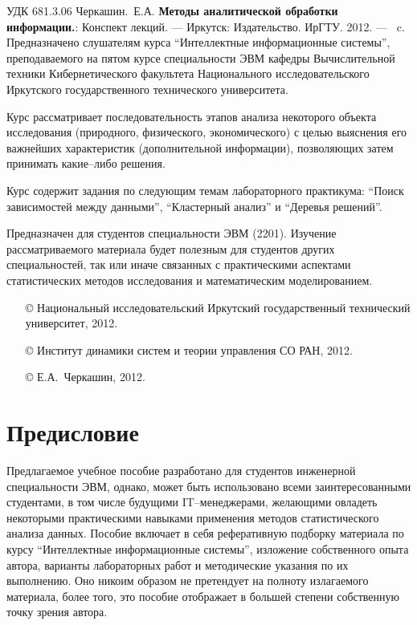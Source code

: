\documentclass[12pt, openany, twoside]{book} %
\newenvironment{mygroup}{}{}
\begin{document}
\newpage
\begin{mygroup}
\thispagestyle{empty}
\noindent УДК 681.3.06
\vfill\footnotesize
{Черкашин.~Е.А.} {\bf Методы аналитической обработки информации.}: Конспект лекций. ---
Иркутск: Издательство. ИрГТУ. 2012. --- \pageref{pg:lastpage}~c.
\vfill
Предназначено слушателям курса
``Интеллектные информационные системы'', преподаваемого на пятом курсе
специальности ЭВМ кафедры Вычислительной техники Кибернетического факультета
Национального исследовательского Иркутского государственного технического университета.

Курс рассматривает последовательность этапов анализа некоторого объекта исследования (природного, физического, экономического) с целью выяснения его важнейших  характеристик (дополнительной информации), позволяющих затем принимать какие--либо решения.

Курс содержит задания по следующим темам лабораторного практикума: ``Поиск зависимостей между данными'', ``Кластерный анализ'' и ``Деревья решений''.

Предназначен для студентов специальности ЭВМ (2201). Изучение рассматриваемого материала будет полезным для студентов других специальностей, так или иначе связанных с практическими аспектами статистических методов исследования и математическим моделированием.

\vfill\vfill

\vfill
\hbox{}\hfill
\begin{minipage}{0.6\linewidth}
\begin{itemize}
\setlength{\itemsep}{0pt}
\setlength{\parsep}{0pt}
\item[\copyright{}] Национальный исследовательский Иркутский государственный технический университет, 2012.\item[\copyright{}] Институт динамики систем и теории управления СО РАН, 2012.
\item[\copyright{}] Е.А.~Черкашин, 2012.
\end{itemize}
\end{minipage}
\end{mygroup}
\tableofcontents
\clearpage

\newpage
\section*{Предисловие}
\thispagestyle{empty}

Предлагаемое учебное пособие разработано для студентов  инженерной специальности ЭВМ, однако, может быть использовано всеми заинтересованными студентами, в том числе будущими IT--менеджерами, желающими овладеть некоторыми практическими навыками применения методов статистического анализа данных. Пособие включает в себя рефе\-ра\-тив\-ную подборку материала по курсу ``Интеллектные информационные системы'', изложение собственного опыта автора, варианты лабораторных работ и методические указания по их выполнению. Оно никоим образом не претендует на полноту излагаемого материала, более того, это пособие отображает в большей степени собственную точку зрения автора.
\end{document}
